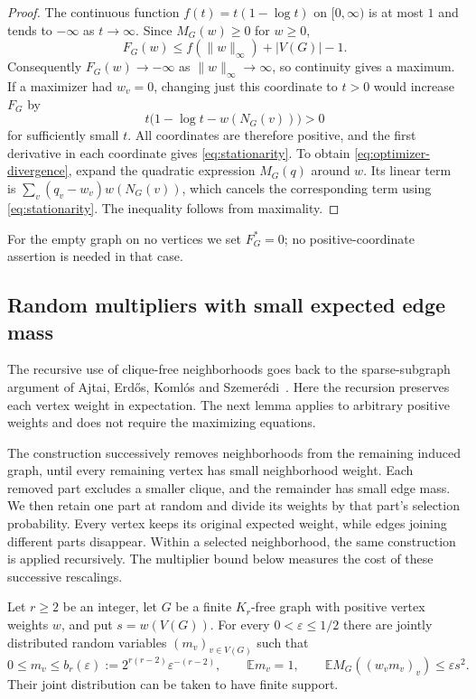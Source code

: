 \begin{proof}
The continuous function $f(t)=t(1-\log t)$ on $[0,\infty)$ is at most $1$
and tends to $-\infty$ as $t\to\infty$.  Since $M_G(w)\ge0$ for $w\ge0$,
\[
 F_G(w)\le f(\|w\|_\infty)+|V(G)|-1.
\]
Consequently $F_G(w)\to-\infty$ as $\|w\|_\infty\to\infty$, so continuity
gives a maximum.  If a maximizer had $w_v=0$, changing just this coordinate
to $t>0$ would increase $F_G$ by
\[
 t\bigl(1-\log t-w(N_G(v))\bigr)>0
\]
for sufficiently small $t$.  All coordinates are therefore positive, and
the first derivative in each coordinate gives \eqref{eq:stationarity}.
To obtain \eqref{eq:optimizer-divergence}, expand the quadratic expression
$M_G(q)$ around $w$.  Its linear term is
$\sum_v(q_v-w_v)w(N_G(v))$, which cancels the corresponding term using
\eqref{eq:stationarity}.  The inequality follows from maximality.
\end{proof}

For the empty graph on no vertices we set $F_G^*=0$; no positive-coordinate
assertion is needed in that case.

\subsection{Random multipliers with small expected edge mass}

The recursive use of clique-free neighborhoods goes back to the
sparse-subgraph argument of Ajtai, Erd\H{o}s, Koml\'os and
Szemer\'edi~\cite[Section~3]{AEKS1981}. Here the recursion preserves
each vertex weight in expectation. The next lemma applies to arbitrary
positive weights and does not require the maximizing equations.

The construction successively removes neighborhoods from the remaining
induced graph, until every remaining vertex has small neighborhood weight.
Each removed part excludes a smaller clique, and the remainder has small
edge mass. We then retain one part at random and divide its weights by
that part's selection probability.
Every vertex keeps its original expected weight, while edges joining
different parts disappear. Within a selected neighborhood, the same
construction is applied recursively. The multiplier bound below measures
the cost of these successive rescalings.

\begin{lemma}\label{lem:sparse-multipliers}
Let $r\ge2$ be an integer, let $G$ be a finite $K_r$-free graph with positive vertex
weights $w$, and put $s=w(V(G))$.  For every $0<\varepsilon\le1/2$ there
are jointly distributed random variables $(m_v)_{v\in V(G)}$ such that
\begin{equation}\label{eq:sparse-multipliers}
 0\le m_v\le b_r(\varepsilon)
 :=2^{r(r-2)}\varepsilon^{-(r-2)},\qquad
 \mathbb E m_v=1,\qquad
 \mathbb E M_G((w_vm_v)_v)\le\varepsilon s^2.
\end{equation}
Their joint distribution can be taken to have finite support.
\end{lemma}

